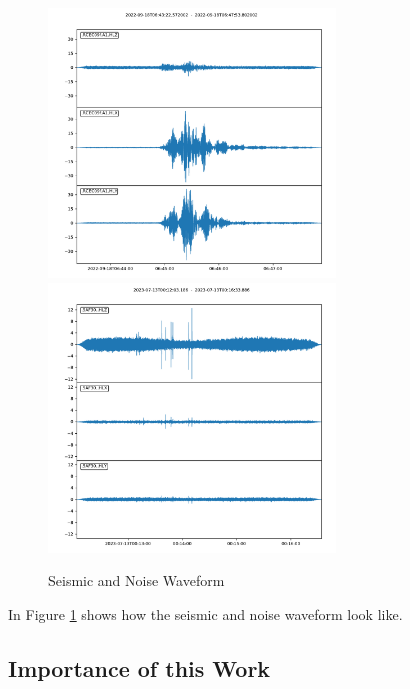 \documentclass[a4paper,12pt, oneside]{article}
\begin{document}
\begin{figure}[H]
\centering
\includegraphics[width = 3in]{event_threechannel.pdf}
\includegraphics[width = 3in]{noise_threechannel.pdf}
\caption{Seismic and Noise Waveform}\label{threechannel}
\end{figure}

In Figure \ref{threechannel} shows how the seismic and noise waveform look like.
%
\newpage
\subsection{Importance of this Work}
%
\newpage
\end{document}
